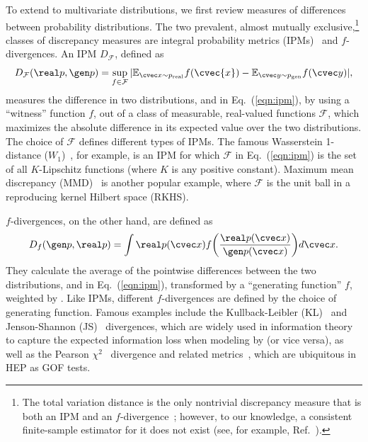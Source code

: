 To extend to multivariate distributions, we first review measures of differences between probability distributions.
The two prevalent, almost mutually exclusive,\footnote{The total variation distance is the only nontrivial discrepancy measure that is both an IPM and an $f$-divergence~\cite[Appendix A]{sriperumbudur_empirical}; however, to our knowledge, a consistent finite-sample estimator for it does not exist (see, for example, Ref.~\cite[Section 5]{sriperumbudur_empirical}).} classes of discrepancy measures are integral probability metrics (IPMs)~\cite{muller_ipms} and $f$-divergences.
An IPM $D_\mathcal{F}$, defined as
\
\begin{equation}\label{eqn:ipm}
    D_\mathcal{F}(\real p, \gen p) = \sup _{f \in \mathcal F} |\mathbb E_{\cvec x \sim p_{\mathrm{real}}} f(\cvec{x}) - \mathbb E_{\cvec y \sim p_{\mathrm{gen}}} f(\cvec y)|,
\end{equation}
measures the difference in two distributions,  and  in Eq.~(\ref{eqn:ipm}), by using a ``witness'' function $f$, out of a class of measurable, real-valued functions $\mathcal{F}$, which maximizes the absolute difference in its expected value over the two distributions.
The choice of $\mathcal{F}$ defines different types of IPMs.
The famous Wasserstein 1-distance ($W_1$)~\cite{wasserstein_original,villani_ot}, for example, is an IPM for which $\mathcal F$ in Eq.~(\ref{eqn:ipm}) is the set of all $K$-Lipschitz functions (where $K$ is any positive constant).
Maximum mean discrepancy (MMD)~\cite{gretton_mmd} is another popular example, where $\mathcal F$ is the unit ball in a reproducing kernel Hilbert space (RKHS).

$f$-divergences, on the other hand, are defined as
\begin{equation}\label{eqn:fdiv}
    D_f(\gen p, \real p) = \int \real p (\cvec x) f \bigg( \frac{\real p (\cvec x)}{\gen p (\cvec x)} \bigg ) d\cvec x.
\end{equation}
They calculate the average of the pointwise differences between the two distributions,  and  in Eq.~(\ref{eqn:ipm}), transformed by a ``generating function'' $f$, weighted by .
Like IPMs, different $f$-divergences are defined by the choice of generating function.
Famous examples include the Kullback-Leibler (KL)~\cite{kl} and Jenson-Shannon (JS)~\cite{js_1,js_2} divergences, which are widely used in information theory to capture the expected information loss when modeling  by  (or vice versa), as well as the Pearson $\chi^2$~\cite{pearson} divergence and related metrics~\cite{Baker:1983tu,generalization_gof,parametric}, which are ubiquitous in HEP as GOF tests.

